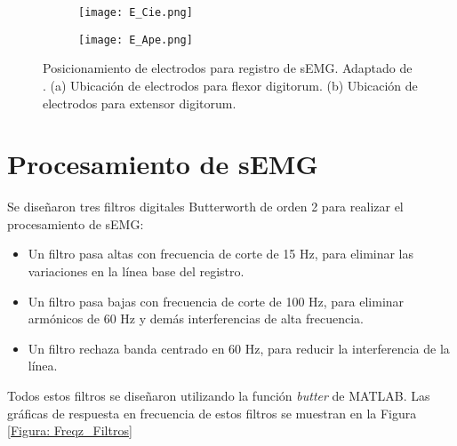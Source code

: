 \vfill
\begin{figure}[htbp]
	\centering
	\begin{subfigure}[htbp]{0.3\textwidth}
		\texttt{[image: E\_Cie.png]}
		\caption{}
		\label{Figura: E_Cie}
	\end{subfigure}
	\hspace{3cm}
	\begin{subfigure}[htbp]{0.3\textwidth}
		\texttt{[image: E\_Ape.png]}
		\caption{}
		\label{Figura: E_Ape}
	\end{subfigure}
	\caption[Posicionamiento de electrodos para registro de sEMG]{Posicionamiento de electrodos para registro de sEMG. Adaptado de \cite{Cavalcanti-Garcia2009}. (a) Ubicación de electrodos para flexor digitorum. (b) Ubicación de electrodos para extensor digitorum.}
	\label{Figura: E_sEMG}
\end{figure}
\vfill

\newpage
\section{Procesamiento de sEMG} \label{Sec: Procesamiento}
Se diseñaron tres filtros digitales Butterworth de orden 2 para realizar el procesamiento de sEMG:

\begin{itemize}
	\item Un filtro pasa altas con frecuencia de corte de 15 Hz, para eliminar las variaciones en la línea base del registro.
	\item Un filtro pasa bajas con frecuencia de corte de 100 Hz, para eliminar armónicos de 60 Hz y demás interferencias de alta frecuencia.
	\item Un filtro rechaza banda centrado en 60 Hz, para reducir la interferencia de la línea.
\end{itemize}

Todos estos filtros se diseñaron utilizando la función \emph{butter} de MATLAB\textregistered. Las gráficas de respuesta en frecuencia de estos filtros se muestran en la Figura \ref{Figura: Freqz_Filtros} %

